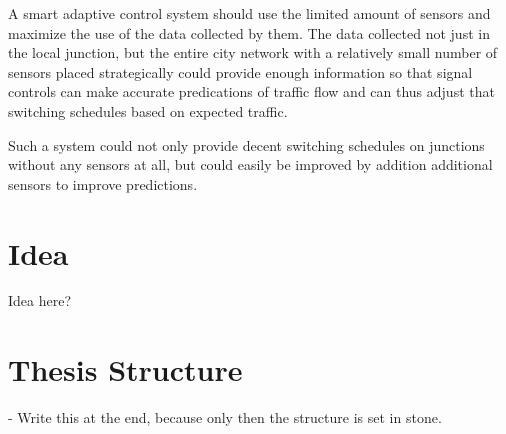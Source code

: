 A smart adaptive control system should use the limited amount of sensors and maximize the use of the data collected by them. The data collected not just in the local junction, but the entire city network with a relatively small number of sensors placed strategically could provide enough information so that signal controls can make accurate predications of traffic flow and can thus adjust that switching schedules based on expected traffic.

Such a system could not only provide decent switching schedules on junctions without any sensors at all, but could easily be improved by addition additional sensors to improve predictions.

\section{Idea}

Idea here?

\newpage

\section{Thesis Structure}

- Write this at the end, because only then the structure is set in stone.